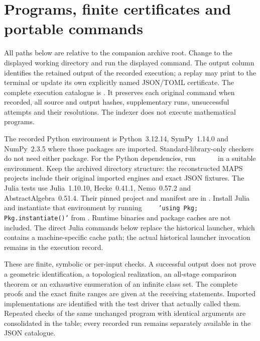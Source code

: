 \section{Programs, finite certificates and portable commands}
\label{app:III:programs}
All paths below are relative to the companion archive root. Change to the
displayed working directory and run the displayed command. The output column
identifies the retained output of the recorded execution; a replay may print
to the terminal or update its own explicitly named JSON/TOML certificate.
The complete execution catalogue is .
It preserves each original command when recorded, all source and output
hashes, supplementary runs, unsuccessful attempts and their resolutions.
The indexer does not execute mathematical programs.

The recorded Python environment is Python~3.12.14, SymPy~1.14.0 and
NumPy~2.3.5 where those packages are imported. Standard-library-only
checkers do not need either package. For the Python dependencies, run
\ \ \ \ \ 
in a suitable environment. Keep the archived directory structure:
the reconstructed MAPS projects include their original imported engines and
exact JSON fixtures. The Julia tests use Julia~1.10.10, Hecke~0.41.1,
Nemo~0.57.2 and AbstractAlgebra~0.51.4. Their pinned project and manifest are
in . Install Julia and instantiate
that environment by running
\ \ \ \ \texttt{'using Pkg; Pkg.instantiate()'}
from . Runtime binaries and package caches are
not included. The direct Julia commands below replace the historical
 launcher, which contains a machine-specific cache path;
the actual historical launcher invocation remains in the execution record.

These are finite, symbolic or per-input checks. A successful output does not
prove a geometric identification, a topological realization, an all-stage
comparison theorem or an exhaustive enumeration of an infinite class set.
The complete proofs and the exact finite ranges are given at the receiving
statements. Imported implementations are identified with the test driver
that actually called them. Repeated checks of the same unchanged program
with identical arguments are consolidated in the table; every recorded run
remains separately available in the JSON catalogue.

